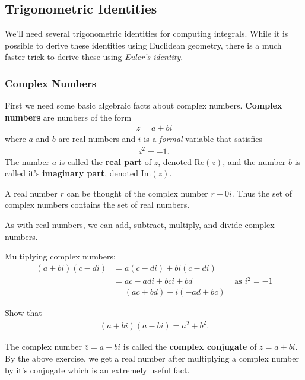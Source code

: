 \subsection{Trigonometric Identities}
We'll need several trigonometric identities for computing integrals.
While it is possible to derive these identities using Euclidean geometry, there is a much faster trick to derive these using {\it Euler's identity}.


\subsubsection{Complex Numbers}
First we need some basic algebraic facts about complex numbers. {\bf Complex numbers} are numbers of the form
\begin{align*}
	z = a + b i
\end{align*}
where $a$ and $b$ are real numbers and $i$ is a {\it formal} variable that satisfies
\begin{align*}
	i^2 = -1.
\end{align*} The number $a$ is called the {\bf real part} of $z$, denoted $\mathrm{Re}(z)$, and the number $b$ is called it's {\bf imaginary part}, denoted $\mathrm{Im}(z)$.

A real number $r$ can be thought of the complex number $ r + 0 i$. Thus the set of complex numbers contains the set of real numbers.

As with real numbers, we can add, subtract, multiply, and
divide complex numbers.
\begin{example} Multiplying complex numbers:
	\begin{align*}
			(a + bi)(c - di)
			&= a(c - di) + bi(c - di) \\
			&= ac - adi + bci + bd  & \mbox{ as } i^2 = -1\\
			&= (ac + bd) + i(-ad + bc)
	\end{align*}
\end{example}

\begin{exercise}
	\label{q:complex_conjugate}
	Show that
	\begin{align*}
		(a + bi) (a - bi) = a^2 + b^2.
	\end{align*}
\end{exercise}

The complex number $\overline{z} = a - bi$ is called the {\bf complex conjugate} of $z=a + bi$.
By the above exercise, we get a real number after multiplying a complex number by it's conjugate which is an extremely useful fact.


